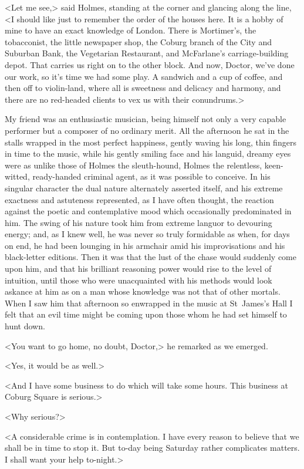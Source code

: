 <Let me see,> said Holmes, standing at the corner and glancing along the line, <I should like just to remember the order of the houses here. It is a hobby of mine to have an exact knowledge of London. There is Mortimer's, the tobacconist, the little newspaper shop, the Coburg branch of the City and Suburban Bank, the Vegetarian Restaurant, and McFarlane's carriage-building depot. That carries us right on to the other block. And now, Doctor, we've done our work, so it's time we had some play. A sandwich and a cup of coffee, and then off to violin-land, where all is sweetness and delicacy and harmony, and there are no red-headed clients to vex us with their conundrums.>

My friend was an enthusiastic musician, being himself not only a very capable performer but a composer of no ordinary merit. All the afternoon he sat in the stalls wrapped in the most perfect happiness, gently waving his long, thin fingers in time to the music, while his gently smiling face and his languid, dreamy eyes were as unlike those of Holmes the sleuth-hound, Holmes the relentless, keen-witted, ready-handed criminal agent, as it was possible to conceive. In his singular character the dual nature alternately asserted itself, and his extreme exactness and astuteness represented, as I have often thought, the reaction against the poetic and contemplative mood which occasionally predominated in him. The swing of his nature took him from extreme languor to devouring energy; and, as I knew well, he was never so truly formidable as when, for days on end, he had been lounging in his armchair amid his improvisations and his black-letter editions. Then it was that the lust of the chase would suddenly come upon him, and that his brilliant reasoning power would rise to the level of intuition, until those who were unacquainted with his methods would look askance at him as on a man whose knowledge was not that of other mortals. When I saw him that afternoon so enwrapped in the music at St~James's Hall I felt that an evil time might be coming upon those whom he had set himself to hunt down.

<You want to go home, no doubt, Doctor,> he remarked as we emerged.

<Yes, it would be as well.>

<And I have some business to do which will take some hours. This business at Coburg Square is serious.>

<Why serious?>

<A considerable crime is in contemplation. I have every reason to believe that we shall be in time to stop it. But to-day being Saturday rather complicates matters. I shall want your help to-night.>

